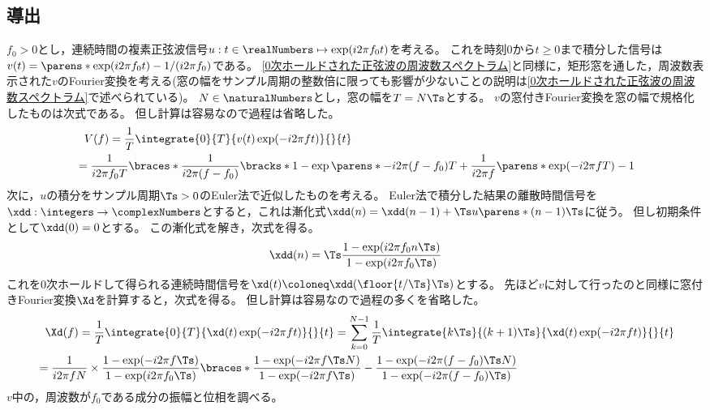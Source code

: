         \subsection{導出}
            $f_0>0$とし，連続時間の複素正弦波信号$u:t\in\realNumbers\mapsto\exp(i 2\pi f_0 t)$を考える。
            これを時刻$0$から$t\geq 0$まで積分した信号は$v(t) = \parens*{\exp(i 2\pi f_0 t)-1} / (i 2\pi f_0)$である。
            \ref{0次ホールドされた正弦波の周波数スペクトラム}と同様に，矩形窓を通した，周波数表示された$v$のFourier変換を考える(窓の幅をサンプル周期の整数倍に限っても影響が少ないことの説明は\ref{0次ホールドされた正弦波の周波数スペクトラム}で述べられている)。
            $N\in\naturalNumbers$とし，窓の幅を$T=N\Ts$とする。
            $v$の窓付きFourier変換を窓の幅で規格化したものは次式である。
            但し計算は容易なので過程は省略した。
            \begin{align*}
                &\phantom{=} V(f) = \frac{1}{T} \integrate{0}{T}{v(t)\exp(-i 2\pi f t)}{}{t} \\
                &= \frac{1}{i 2\pi f_0 T} \braces*{\frac{1}{i 2\pi (f-f_0)}\bracks*{1 - \exp\parens*{-i 2\pi (f-f_0)T}} + \frac{1}{i 2\pi f}\parens*{\exp(-i 2\pi f T) - 1}}
            \end{align*}
            次に，$u$の積分をサンプル周期$\Ts>0$のEuler法で近似したものを考える。
            Euler法で積分した結果の離散時間信号を$\xdd:\integers\to\complexNumbers$とすると，これは漸化式$\xdd(n) = \xdd(n-1) + \Ts u\parens*{(n-1)\Ts}$に従う。
            但し初期条件として$\xdd(0)=0$とする。
            この漸化式を解き，次式を得る。
            \[ \xdd(n) = \Ts\frac{1-\exp(i 2\pi f_0 n\Ts)}{1-\exp(i 2\pi f_0\Ts)} \]
            これを0次ホールドして得られる連続時間信号を$\xd(t) \coloneq \xdd(\floor{t/\Ts}\Ts)$とする。
            先ほど$v$に対して行ったのと同様に窓付きFourier変換$\Xd$を計算すると，次式を得る。
            但し計算は容易なので過程の多くを省略した。
            \begin{align*}
                &\phantom{=} \Xd(f) = \frac{1}{T} \integrate{0}{T}{\xd(t)\exp(-i 2\pi f t)}{}{t} = \sum_{k=0}^{N-1} \frac{1}{T} \integrate{k\Ts}{(k+1)\Ts}{\xd(t)\exp(-i 2\pi f t)}{}{t} \\
                &= \frac{1}{i 2\pi f N}\times\frac{1-\exp(-i 2\pi f\Ts)}{1-\exp(i 2\pi f_0\Ts)} \braces*{\frac{1-\exp(-i 2\pi f \Ts N)}{1-\exp(-i 2\pi f \Ts)} - \frac{1-\exp(-i 2\pi (f-f_0) \Ts N)}{1-\exp(-i 2\pi (f-f_0) \Ts)}}
            \end{align*}
            $v$中の，周波数が$f_0$である成分の振幅と位相を調べる。
